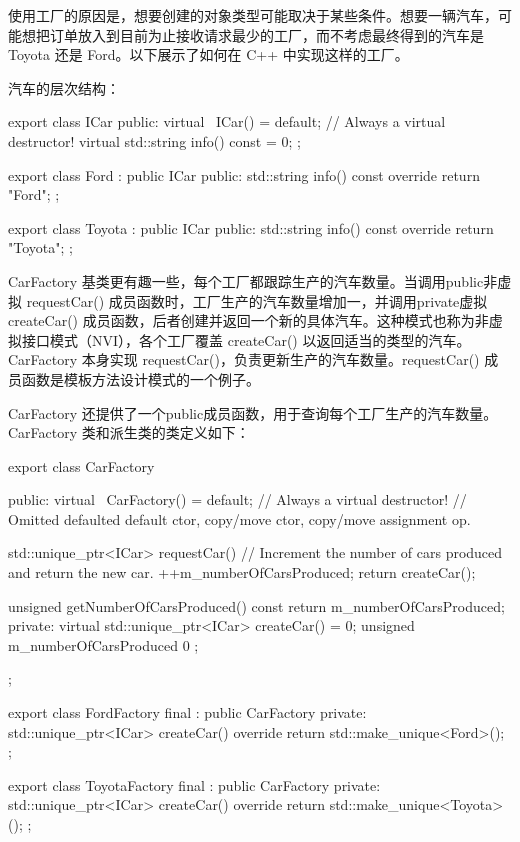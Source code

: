 
使用工厂的原因是，想要创建的对象类型可能取决于某些条件。想要一辆汽车，可能想把订单放入到目前为止接收请求最少的工厂，而不考虑最终得到的汽车是 Toyota 还是 Ford。以下展示了如何在 C++ 中实现这样的工厂。

汽车的层次结构：

\begin{cpp}
export class ICar
{
    public:
        virtual ~ICar() = default; // Always a virtual destructor!
        virtual std::string info() const = 0;
};

export class Ford : public ICar
{
    public:
        std::string info() const override { return "Ford"; }
};

export class Toyota : public ICar
{
    public:
        std::string info() const override { return "Toyota"; }
};
\end{cpp}

CarFactory 基类更有趣一些，每个工厂都跟踪生产的汽车数量。当调用public非虚拟 requestCar() 成员函数时，工厂生产的汽车数量增加一，并调用private虚拟 createCar() 成员函数，后者创建并返回一个新的具体汽车。这种模式也称为非虚拟接口模式（NVI），各个工厂覆盖 createCar() 以返回适当的类型的汽车。CarFactory 本身实现 requestCar()，负责更新生产的汽车数量。requestCar() 成员函数是模板方法设计模式的一个例子。

CarFactory 还提供了一个public成员函数，用于查询每个工厂生产的汽车数量。CarFactory 类和派生类的类定义如下：

\begin{cpp}
export class CarFactory
{
    public:
        virtual ~CarFactory() = default; // Always a virtual destructor!
        // Omitted defaulted default ctor, copy/move ctor, copy/move assignment op.

        std::unique_ptr<ICar> requestCar()
        {
            // Increment the number of cars produced and return the new car.
            ++m_numberOfCarsProduced;
            return createCar();
        }

        unsigned getNumberOfCarsProduced() const { return m_numberOfCarsProduced; }
    private:
        virtual std::unique_ptr<ICar> createCar() = 0;
        unsigned m_numberOfCarsProduced { 0 };
};

export class FordFactory final : public CarFactory
{
    private:
        std::unique_ptr<ICar> createCar() override {
            return std::make_unique<Ford>(); }
};

export class ToyotaFactory final : public CarFactory
{
    private:
        std::unique_ptr<ICar> createCar() override {
            return std::make_unique<Toyota>(); }
};
\end{cpp}

